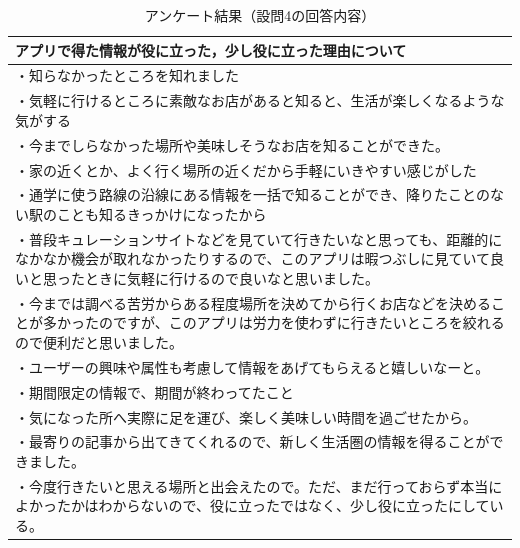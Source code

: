 \documentclass[a4paper]{jsarticle}
\begin{document}
\begin{enumerate}
\begin{enumerate}
\begin{enumerate}
  \begin{table}[H]
    \begin{center}
      \caption{アンケート結果（設問4の回答内容）}
      \renewcommand\arraystretch{1.2}
      \begin{tabular}{|p{15cm}|}
        \hline
        アプリで得た情報が役に立った，少し役に立った理由について \\
        \hline
        ・知らなかったところを知れました \\
        ・気軽に行けるところに素敵なお店があると知ると、生活が楽しくなるような気がする \\
        ・今までしらなかった場所や美味しそうなお店を知ることができた。 \\
        ・家の近くとか、よく行く場所の近くだから手軽にいきやすい感じがした \\
        ・通学に使う路線の沿線にある情報を一括で知ることができ、降りたことのない駅のことも知るきっかけになったから \\
        ・普段キュレーションサイトなどを見ていて行きたいなと思っても、距離的になかなか機会が取れなかったりするので、このアプリは暇つぶしに見ていて良いと思ったときに気軽に行けるので良いなと思いました。 \\
        ・今までは調べる苦労からある程度場所を決めてから行くお店などを決めることが多かったのですが、このアプリは労力を使わずに行きたいところを絞れるので便利だと思いました。 \\
        ・ユーザーの興味や属性も考慮して情報をあげてもらえると嬉しいなーと。 \\
        ・期間限定の情報で、期間が終わってたこと \\
        ・気になった所へ実際に足を運び、楽しく美味しい時間を過ごせたから。 \\
        ・最寄りの記事から出てきてくれるので、新しく生活圏の情報を得ることができました。 \\
        ・今度行きたいと思える場所と出会えたので。ただ、まだ行っておらず本当によかったかはわからないので、役に立ったではなく、少し役に立ったにしている。 \\
        \hline
      \end{tabular}
      \label{tab:curation-04-result}
    \end{center}
  \end{table}


\end{enumerate}
\end{enumerate}
\end{enumerate}
\end{document}
